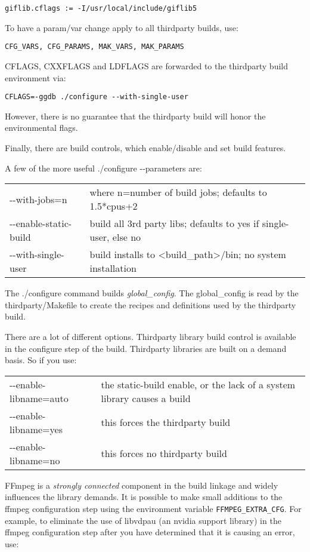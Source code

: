 \hspace{2em}\texttt{giflib.cflags := -I/usr/local/include/giflib5}

To have a param/var change apply to all thirdparty builds, use:

\hspace{2em}\texttt{CFG\_VARS, CFG\_PARAMS, MAK\_VARS, MAK\_PARAMS}

CFLAGS, CXXFLAGS and LDFLAGS are forwarded to the thirdparty build environment via:

\hspace{2em}\texttt{CFLAGS=-ggdb ./configure -{}-with-single-user}

However, there is no guarantee that the thirdparty build will honor the environmental flags.

Finally, there are build controls, which enable/disable and set build features.

A few of the more useful ./configure -{}-parameters are:

\begin{tabular}{ll}
	-{}-with-jobs=n & where n=number of build jobs; defaults to 1.5*cpus+2\\
	-{}-enable-static-build & build all 3rd party libs; defaults to yes if single-user, else no\\
	-{}-with-single-user& build installs to <build\_path>/bin; no system installation\\
\end{tabular}


The ./configure command builds \textit{global\_config}. The global\_config is read by the thirdparty/Makefile to create the recipes and definitions used by the thirdparty build.

There are a lot of different options.  Thirdparty library build control is available in the configure step of the build.  Thirdparty libraries are built on a demand basis.  So if you use:

\begin{tabular}{l p{11cm}}
  -{}-enable-libname=auto & the static-build enable, or the lack of a system library causes a build\\
  -{}-enable-libname=yes  &  this forces the thirdparty build\\
  -{}-enable-libname=no   &  this forces no thirdparty build\\
\end{tabular}

FFmpeg is a \textit{strongly connected} component in the build linkage and widely influences the \CGG{} library demands.  It is possible to make small additions to the ffmpeg configuration step using the environment variable \texttt{FFMPEG\_EXTRA\_CFG}.  For example, to eliminate the use of libvdpau (an nvidia support library) in the ffmpeg configuration step after you have determined that it is causing an error, use:


